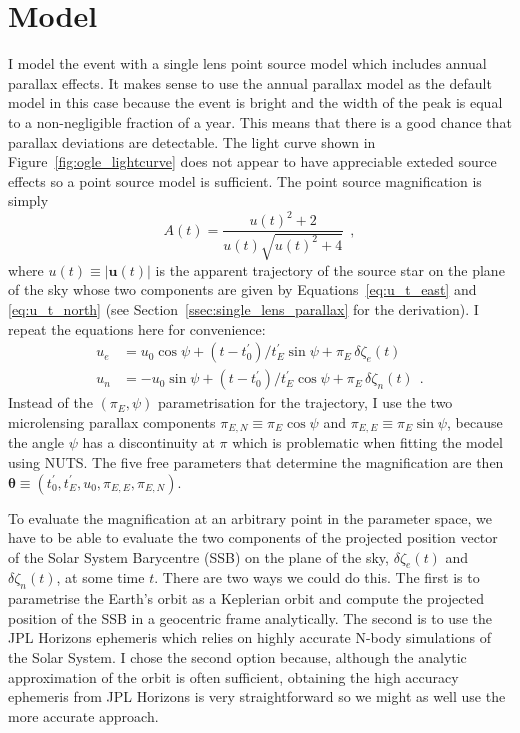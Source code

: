 \documentclass[12pt,dvipsnames]{report}
\newcommand{\ssf}[1]{\textsf{#1}}
\renewcommand{\vec}[1]{\boldsymbol{\mathbf{#1}}}
\newcommand{\hquad}{~~}
\begin{document}
\section{Model}
\label{sec:model_single_lens}
I model the event with a single lens point source model which includes annual parallax 
effects. It makes sense to use the annual parallax model as the default model in this case because 
the event is bright and the width of the peak is equal to a non-negligible fraction 
of a year. This means that there is a good chance that parallax deviations are detectable. 
The light curve shown in Figure~\ref{fig:ogle_lightcurve} does not appear to have appreciable 
exteded source effects so a point source model is sufficient.
The point source magnification is simply 
\begin{equation}
    A(t) = \frac{u(t)^2 + 2}{u(t)  \sqrt{u(t)^2 + 4}}
    \hquad,
\end{equation}
where $u(t)\equiv |\vec u(t)|$ is the apparent trajectory of the source star on the plane 
of the sky whose two components are given by Equations~\ref{eq:u_t_east} and 
\ref{eq:u_t_north} (see Section~\ref{ssec:single_lens_parallax} for the derivation). I 
repeat the equations here for convenience:
\begin{align}
    u_e & =u_0\cos\psi + (t-t_0^\prime)/t_E^\prime\sin\psi + \pi_E\,\delta\zeta_e(t)  \\
    u_n & =-u_0\sin\psi + (t-t_0^\prime)/t_E^\prime\cos\psi + \pi_E\,\delta\zeta_n(t)
    \hquad.
\end{align}
Instead of the $(\pi_E, \psi)$ parametrisation for the trajectory, I use the two 
microlensing parallax components $\pi_{E,N}\equiv\pi_E\cos\psi$ and 
$\pi_{E,E}\equiv\pi_E\sin\psi$, because the angle $\psi$ has a discontinuity at $\pi$ 
which is problematic when fitting the model using NUTS. 
The five free parameters that determine the 
magnification are then $\vec\theta\equiv(t_0^\prime, t_E^\prime, u_0, \pi_{E,E}, \pi_{E,N})$.

To evaluate the magnification at an arbitrary point in the parameter space, we have 
to be able to evaluate the two components of the projected position vector of the 
Solar System Barycentre (SSB) on the plane of the sky, $\delta\zeta_e(t)$ and 
$\delta\zeta_n(t)$, at some time $t$. 
There are two ways we could do this. The first is to parametrise the Earth's orbit 
as a Keplerian orbit and compute the projected position of the SSB in a geocentric 
frame analytically. The second is to use the \ssf{JPL Horizons} ephemeris which 
relies on highly accurate N-body simulations of the Solar System.
I chose the second option because, although the analytic approximation of the orbit 
is often sufficient, obtaining the high accuracy ephemeris from \ssf{JPL Horizons} is very 
straightforward so we might as well use the more accurate approach. 
\end{document}
